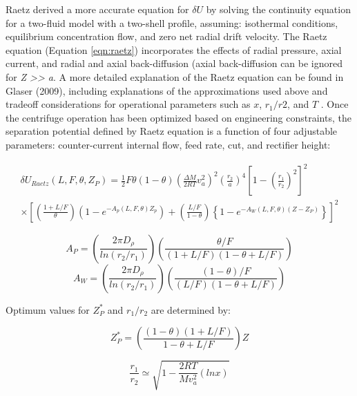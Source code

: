 Raetz derived a more accurate equation for $\delta U$ by solving the continuity equation for a two-fluid model with a two-shell profile, assuming: isothermal conditions, equilibrium concentration flow, and zero net radial drift velocity\cite{Raetz}.  The Raetz equation (Equation \ref{eqn:raetz}) incorporates the effects of radial pressure, axial current, and radial and axial back-diffusion (axial back-diffusion can be ignored for \emph{Z >> a}. A more detailed explanation of the Raetz equation can be found in Glaser (2009), including explanations of the approximations used above and tradeoff considerations for operational parameters such as $x$, $r_{1}/r{2}$, and $T$ \cite{glaser_2009}.  Once the centrifuge operation has been optimized based on engineering constraints, the separation potential defined by Raetz equation is a function of four adjustable parameters: counter-current internal flow, feed rate, cut, and rectifier height:

\begin{multline}
  \label{eqn:raetz}
  \delta U_{Raetz}(L,F,\theta,Z_{P})
  =\frac{1}{2}F\theta (1-\theta)
  \left ( \frac{\Delta M}{2RT}v_{a}^{2} \right )^{2}
  \left ( \frac{r_{2}}{a} \right )^{4}
  \left [1-\left ( \frac{r_{1}}{r_2} \right )^{2}
  \right ] ^{2} \\
\times \left[
  \left( \frac{1+L/F}{\theta} \right )
  \left ( 1 - e^{-A_{p}(L,F,\theta)Z_{p}}\right )
  + \left (\frac{L/F}{1-\theta}\right )
  \left \{ 1-e^{-A_{W}(L,F,\theta)(Z - Z_{P})} \right \} 
  \right]^{2}
\end{multline}

\begin{equation}
  A_{P} = \left (
  \frac{2 \pi D_{\rho}}{ln(r_{2}/r_{1})}
  \right )
  \left (
  \frac{\theta/F}{(1+L/F)(1-\theta+L/F)}
  \right )
\end{equation}
\begin{equation}
  A_{W} = \left (
  \frac{2 \pi D_{\rho}}{ln(r_{2}/r_{1})}
  \right )
  \left (
  \frac{(1-\theta )/F}{(L/F)(1-\theta+L/F)}
  \right )
\end{equation}

Optimum values for $Z_{P}^{*}$ and $r_{1}/r_{2}$ are determined by:

\begin{equation}
  Z_{P}^{*} = \left (
  \frac{(1-\theta)(1+L/F)}{1-\theta+L/F}
  \right ) Z
\end{equation}

\begin{equation}
\frac{r_{1}}{r_{2}} \simeq \sqrt{1 -\frac{2RT}{M v^{2}_{a}} (ln x)}
\end{equation}

